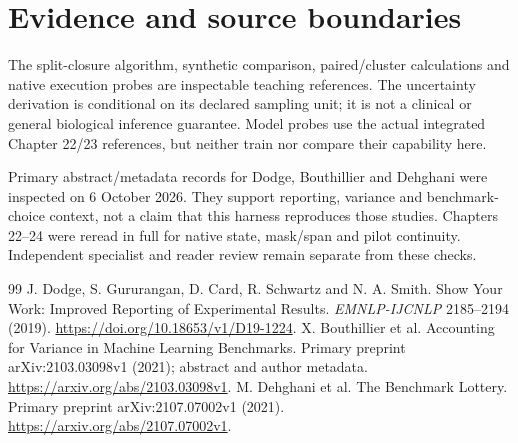 \chapter*{Evidence and source boundaries}
The split-closure algorithm, synthetic comparison, paired/cluster calculations
and native execution probes are inspectable teaching references. The uncertainty
derivation is conditional on its declared sampling unit; it is not a clinical
or general biological inference guarantee. Model probes use the actual integrated
Chapter 22/23 references, but neither train nor compare their capability here.

Primary abstract/metadata records for Dodge, Bouthillier and Dehghani were
inspected on 6 October 2026. They support reporting, variance and benchmark-choice
context, not a claim that this harness reproduces those studies.
Chapters 22--24 were reread in full for native state, mask/span and pilot continuity.
Independent specialist and reader review remain separate from these checks.

\begin{thebibliography}{99}
 J. Dodge, S. Gururangan, D. Card, R. Schwartz and N. A. Smith.
Show Your Work: Improved Reporting of Experimental Results.
\emph{EMNLP-IJCNLP} 2185--2194 (2019).
\url{https://doi.org/10.18653/v1/D19-1224}.
 X. Bouthillier et al. Accounting for Variance in Machine Learning
Benchmarks. Primary preprint arXiv:2103.03098v1 (2021); abstract and author metadata.
\url{https://arxiv.org/abs/2103.03098v1}.
 M. Dehghani et al. The Benchmark Lottery.
Primary preprint arXiv:2107.07002v1 (2021).
\url{https://arxiv.org/abs/2107.07002v1}.
\end{thebibliography}
